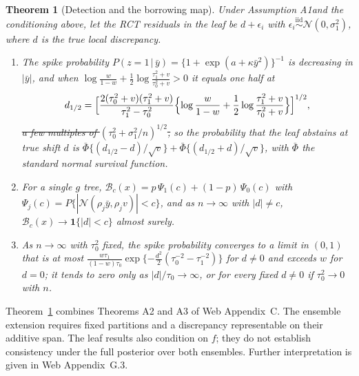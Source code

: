 \documentclass[11pt]{article}
\newcommand{\Normal}{\mathcal{N}}
\newcommand{\given}{\,\vert\,}
\newcommand{\iid}{\stackrel{\text{iid}}{\sim}}
\newtheorem{theorem}{Theorem}
\theoremstyle{definition}
\theoremstyle{plain}
\providecommand{\DIFaddtex}[1]{{\protect\color{blue}\uwave{#1}}} %
\providecommand{\DIFdeltex}[1]{{\protect\color{red}\sout{#1}}}                      %
\providecommand{\DIFaddbegin}{} %
\providecommand{\DIFaddend}{} %
\providecommand{\DIFdelbegin}{} %
\providecommand{\DIFdelend}{} %
\providecommand{\DIFadd}[1]{\texorpdfstring{\DIFaddtex{#1}}{#1}} %
\providecommand{\DIFdel}[1]{\texorpdfstring{\DIFdeltex{#1}}{}} %
\newcommand{\DIFscaledelfig}{0.5}
\newlength{\DIFdelgraphicswidth} %
\newlength{\DIFdelgraphicsheight} %
\newcommand{\DIFaddincludegraphics}[2][]{{\color{blue}\fbox{\DIFOincludegraphics[#1]{#2}}}} %
\newcommand{\DIFdelincludegraphics}[2][]{%
\sbox{\DIFdelgraphicsbox}{\DIFOincludegraphics[#1]{#2}}%
\settoboxwidth{\DIFdelgraphicswidth}{\DIFdelgraphicsbox} %
\settoboxtotalheight{\DIFdelgraphicsheight}{\DIFdelgraphicsbox} %
\scalebox{\DIFscaledelfig}{%
\parbox[b]{\DIFdelgraphicswidth}{\usebox{\DIFdelgraphicsbox}\\[-\baselineskip] \rule{\DIFdelgraphicswidth}{0em}}\llap{\resizebox{\DIFdelgraphicswidth}{\DIFdelgraphicsheight}{%
\setlength{\unitlength}{\DIFdelgraphicswidth}%
\begin{picture}(1,1)%
\thicklines\linethickness{2pt} %
{\color[rgb]{1,0,0}\put(0,0){\framebox(1,1){}}}%
{\color[rgb]{1,0,0}\put(0,0){\line( 1,1){1}}}%
{\color[rgb]{1,0,0}\put(0,1){\line(1,-1){1}}}%
\end{picture}%
}\hspace*{3pt}}} %
} %
\DeclareRobustCommand{\DIFaddbegin}{\DIFOaddbegin \let\includegraphics\DIFaddincludegraphics} %
\DeclareRobustCommand{\DIFaddend}{\DIFOaddend \let\includegraphics\DIFOincludegraphics} %
\DeclareRobustCommand{\DIFdelbegin}{\DIFOdelbegin \let\includegraphics\DIFdelincludegraphics} %
\DeclareRobustCommand{\DIFdelend}{\DIFOaddend \let\includegraphics\DIFOincludegraphics} %
\begin{document}
\begin{theorem}[Detection and the borrowing map]\label{thm:map}
Under Assumption A1\DIFaddbegin \DIFadd{, $0<w<1$, }\DIFaddend and the conditioning above, let the RCT residuals in the leaf be $d+\epsilon_i$ with $\epsilon_i\iid\Normal(0,\sigma_1^2)$, where $d$ is the true local discrepancy.
\begin{enumerate}[label=(\alph*),leftmargin=2.2em]
\item The spike probability $P(z=1\given\bar y)=\{1+\exp(a+\kappa\bar y^2)\}^{-1}$ is decreasing in $|\bar y|$, and when $\log\frac{w}{1-w}+\frac{1}{2}\log\frac{\tau_1^2+v}{\tau_0^2+v}>0$ it equals one half at
\[
d_{1/2}=\Bigl[\frac{2(\tau_0^2+v)(\tau_1^2+v)}{\tau_1^2-\tau_0^2}\Bigl\{\log\frac{w}{1-w}+\frac{1}{2}\log\frac{\tau_1^2+v}{\tau_0^2+v}\Bigr\}\Bigr]^{1/2},
\]
\DIFdelbegin \DIFdel{a few multiples of $(\tau_0^2+\sigma_1^2/n)^{1/2}$, }\DIFdelend so the probability that the leaf abstains at true shift $d$ is $\bar\Phi\{(d_{1/2}-d)/\sqrt v\}+\bar\Phi\{(d_{1/2}+d)/\sqrt v\}$, with $\bar\Phi$ the standard normal survival function.
\item For a single $g$ tree, $\mathcal B_c(x)=p\,\Psi_1(c)+(1-p)\,\Psi_0(c)$ with $\Psi_j(c)=P\{|\Normal(\rho_j\bar y,\rho_jv)|<c\}$, and as $n\to\infty$ with $|d|\ne c$, $\mathcal B_c(x)\to\mathbf 1\{|d|<c\}$ almost surely.
\item As $n\to\infty$ with $\tau_0^2$ fixed, the spike probability converges to a limit in $(0,1)$ that is at most $\frac{w\tau_1}{(1-w)\tau_0}\exp\{-\frac{d^2}{2}(\tau_0^{-2}-\tau_1^{-2})\}$ for $d\ne0$ and exceeds $w$ for $d=0$; it tends to zero only as $|d|/\tau_0\to\infty$, or for every fixed $d\ne0$ if $\tau_0^2\to0$ with $n$.
\end{enumerate}
\end{theorem}

Theorem~\ref{thm:map} combines Theorems A2 and A3 of Web Appendix~C. The ensemble extension requires fixed partitions and a discrepancy representable on their additive span. The leaf results also condition on $f$; they do not establish consistency under the full posterior over both ensembles. Further interpretation is given in Web Appendix~G.3.
\end{document}
